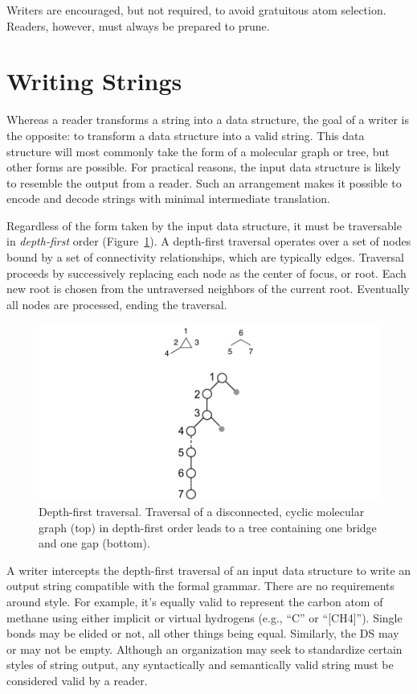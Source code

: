 \documentclass{article}
\begin{document}
Writers are encouraged, but not required, to avoid gratuitous atom selection. Readers, however, must always be prepared to prune.

\section*{Writing Strings}

Whereas a reader transforms a string into a data structure, the goal of a writer is the opposite: to transform a data structure into a valid string. This data structure will most commonly take the form of a molecular graph or tree, but other forms are possible. For practical reasons, the input data structure is likely to resemble the output from a reader. Such an arrangement makes it possible to encode and decode strings with minimal intermediate translation.

Regardless of the form taken by the input data structure, it must be traversable in \textit{depth-first} order (Figure~\ref{fig:depth-first-traversal}). A depth-first traversal operates over a set of nodes bound by a set of connectivity relationships, which are typically edges. Traversal proceeds by successively replacing each node as the center of focus, or root. Each new root is chosen from the untraversed neighbors of the current root. Eventually all nodes are processed, ending the traversal.

\begin{figure}
    \centering
    \includegraphics[width=\columnwidth]{depth-first-traversal.pdf}
    \caption{Depth-first traversal. Traversal of a disconnected, cyclic molecular graph (top) in depth-first order leads to a tree containing one bridge and one gap (bottom).}
    \label{fig:depth-first-traversal}
\end{figure}

A writer intercepts the depth-first traversal of an input data structure to write an output string compatible with the formal grammar. There are no requirements around style. For example, it's equally valid to represent the carbon atom of methane using either implicit or virtual hydrogens (e.g., \enquote{C} or \enquote{[CH4]}). Single bonds may be elided or not, all other things being equal. Similarly, the DS may or may not be empty. Although an organization may seek to standardize certain styles of string output, any syntactically and semantically valid string must be considered valid by a reader.
\end{document}
